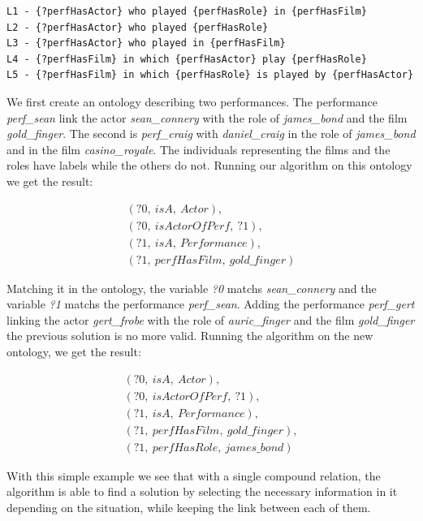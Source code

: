 \begin{lstlisting}[frame=single, caption={ The set of labels usable to describe the performance compound relation.}, label={lst:chap7_perf_labels}, captionpos=b, style=Labels, mathescape=true]
L1 - {?perfHasActor} who played {perfHasRole} in {perfHasFilm}
L2 - {?perfHasActor} who played {perfHasRole}
L3 - {?perfHasActor} who played in {perfHasFilm}
L4 - {?perfHasFilm} in which {perfHasActor} play {perfHasRole}
L5 - {?perfHasFilm} in which {perfHasRole} is played by {perfHasActor}
\end{lstlisting}

We first create an ontology describing two performances. The performance \textit{perf\_sean} link the actor \textit{sean\_connery} with the role of \textit{james\_bond} and the film \textit{gold\_finger}. The second is \textit{perf\_craig} with \textit{daniel\_craig} in the role of \textit{james\_bond} and in the film \textit{casino\_royale}. The individuals representing the films and the roles have labels while the others do not. Running our algorithm on this ontology we get the result:

\begin{gather*}
(?0,\ isA,\ Actor),\\
(?0,\ isActorOfPerf,\ ?1),\\
(?1,\ isA,\ Performance),\\
(?1,\ perfHasFilm,\ gold\_finger)
\end{gather*}

Matching it in the ontology, the variable \textit{?0} matchs \textit{sean\_connery} and the variable \textit{?1} matchs the performance \textit{perf\_sean}. Adding the performance \textit{perf\_gert} linking the actor \textit{gert\_frobe} with the role of \textit{auric\_finger} and the film \textit{gold\_finger} the previous solution is no more valid. Running the algorithm on the new ontology, we get the result:

\begin{gather*}
(?0,\ isA,\ Actor),\\
(?0,\ isActorOfPerf,\ ?1),\\
(?1,\ isA,\ Performance),\\
(?1,\ perfHasFilm,\ gold\_finger),\\
(?1,\ perfHasRole,\ james\_bond)
\end{gather*}

With this simple example we see that with a single compound relation, the algorithm is able to find a solution by selecting the necessary information in it depending on the situation, while keeping the link between each of them.


